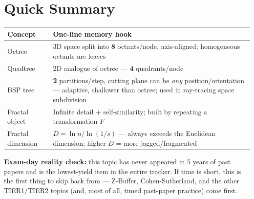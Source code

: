 \documentclass[12pt, a4paper]{article}
\newenvironment{notesbox}{\begin{mdframed}[style=notesframe]}{\end{mdframed}}
\begin{document}
\section{Quick Summary}
\begin{center}
\renewcommand{\arraystretch}{1.3}
\begin{tabular}{p{3.4cm}|p{10cm}}
\toprule
\textbf{Concept} & \textbf{One-line memory hook} \\
\midrule
Octree & 3D space split into \textbf{8} octants/node, axis-aligned; homogeneous octants are leaves \\
Quadtree & 2D analogue of octree --- \textbf{4} quadrants/node \\
BSP tree & \textbf{2} partitions/step, cutting plane can be \emph{any} position/orientation --- adaptive, shallower than octree; used in ray-tracing space subdivision \\
Fractal object & Infinite detail + self-similarity; built by repeating a transformation $F$ \\
Fractal dimension & $D=\ln n/\ln(1/s)$ --- always exceeds the Euclidean dimension; higher $D$ = more jagged/fragmented \\
\bottomrule
\end{tabular}
\end{center}
\begin{notesbox}
\textbf{Exam-day reality check:} this topic has never appeared in 5 years of past papers and is the lowest-yield item in the entire tracker. If time is short, this is the first thing to skip back from --- Z-Buffer, Cohen-Sutherland, and the other TIER1/TIER2 topics (and, most of all, timed past-paper practice) come first.
\end{notesbox}
\end{document}
